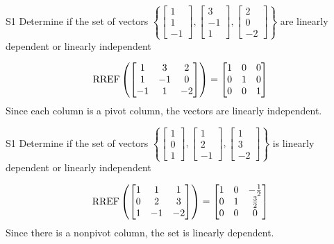 \begin{problem}{S1}
Determine if the set of vectors \(\left\{\begin{bmatrix} 1 \\ 1 \\ -1 \end{bmatrix}, \begin{bmatrix} 3 \\ -1 \\ 1 \end{bmatrix}, \begin{bmatrix} 2 \\ 0 \\ -2 \end{bmatrix}\right\}\) are linearly dependent or linearly independent
\end{problem}
\begin{solution}
$$\operatorname{RREF}\left(\begin{bmatrix} 1 & 3 & 2 \\ 1 & -1 & 0 \\ -1 & 1 & -2 \end{bmatrix} \right)= \begin{bmatrix} 1 & 0 &0 \\ 0 & 1 & 0 \\ 0 & 0 & 1\end{bmatrix}$$
Since each column is a pivot column, the vectors are linearly independent.
\end{solution}


\begin{problem}{S1}
Determine if the set of vectors  $\left\{\begin{bmatrix} 1 \\ 0 \\ 1 \end{bmatrix}, \begin{bmatrix} 1 \\ 2 \\ -1 \end{bmatrix}, \begin{bmatrix} 1 \\ 3 \\ -2 \end{bmatrix}\right\}$ is  linearly dependent or linearly independent
\end{problem}
\begin{solution}
$$\operatorname{RREF}\left( \begin{bmatrix} 1 &  1 & 1 \\ 0  & 2 & 3 \\ 1  & -1 & -2 \end{bmatrix} \right) = \begin{bmatrix} 1 &  0 & -\frac{1}{2} \\ 0  & 1 & \frac{3}{2} \\ 0& 0 & 0  \end{bmatrix}$$
Since there is a nonpivot column, the set is linearly dependent.
\end{solution}


